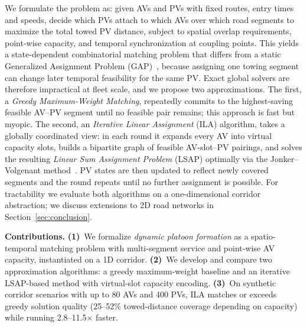 \documentclass[sigconf]{acmart}
\begin{document}
We formulate the problem as: given AVs and PVs with fixed routes, entry times and speeds, decide which PVs attach to which AVs over which road segments to maximize the total towed PV distance, subject to spatial overlap requirements, point-wise capacity, and temporal synchronization at coupling points. This yields a state-dependent combinatorial matching problem that differs from a static Generalized Assignment Problem (GAP)~\cite{cattrysse1992survey}, because assigning one towing segment can change later temporal feasibility for the same PV. Exact global solvers are therefore impractical at fleet scale, and we propose two approximations. The first, a \textit{Greedy Maximum-Weight Matching}, repeatedly commits to the highest-saving feasible AV--PV segment until no feasible pair remains; this approach is fast but myopic. The second, an \textit{Iterative Linear Assignment} (ILA) algorithm, takes a globally coordinated view: in each round it expands every AV into virtual capacity slots, builds a bipartite graph of feasible AV-slot--PV pairings, and solves the resulting \emph{Linear Sum Assignment Problem} (LSAP) optimally via the Jonker--Volgenant method~\cite{scipy2020}. PV states are then updated to reflect newly covered segments and the round repeats until no further assignment is possible. For tractability we evaluate both algorithms on a one-dimensional corridor abstraction; we discuss extensions to 2D road networks in Section~\ref{sec:conclusion}.

\noindent\textbf{Contributions.}
\textbf{(1)}~We formalize \emph{dynamic platoon formation} as a spatio-temporal matching problem with multi-segment service and point-wise AV capacity, instantiated on a 1D corridor.
\textbf{(2)}~We develop and compare two approximation algorithms: a greedy maximum-weight baseline and an iterative LSAP-based method with virtual-slot capacity encoding.
\textbf{(3)}~On synthetic corridor scenarios with up to 80 AVs and 400 PVs, ILA matches or exceeds greedy solution quality (25--52\% towed-distance coverage depending on capacity) while running 2.8--11.5$\times$ faster.


\end{document}
